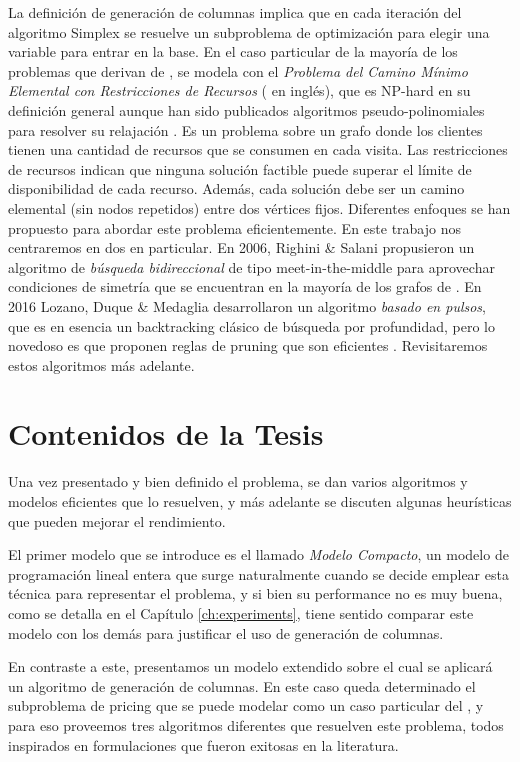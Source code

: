 La definición de generación de columnas implica que en cada iteración del algoritmo Simplex se resuelve un subproblema de optimización para elegir una variable para entrar en la base. En el caso particular de la mayoría de los problemas que derivan de , se modela con el \emph{Problema del Camino Mínimo Elemental con Restricciones de Recursos} ( en inglés), que es NP-hard en su definición general aunque han sido publicados algoritmos pseudo-polinomiales para resolver su relajación \cite{christo-et-al}. Es un problema sobre un grafo donde los clientes tienen una cantidad de recursos que se consumen en cada visita. Las restricciones de recursos indican que ninguna solución factible puede superar el límite de disponibilidad de cada recurso. Además, cada solución debe ser un camino elemental (sin nodos repetidos) entre dos vértices fijos. Diferentes enfoques se han propuesto para abordar este problema eficientemente. En este trabajo nos centraremos en dos en particular. En 2006, Righini \& Salani propusieron un algoritmo de \emph{búsqueda bidireccional} de tipo meet-in-the-middle para aprovechar condiciones de simetría que se encuentran en la mayoría de los grafos de  \cite{righini-salani}. En 2016 Lozano, Duque \& Medaglia desarrollaron un algoritmo \emph{basado en pulsos}, que es en esencia un backtracking clásico de búsqueda por profundidad, pero lo novedoso es que proponen reglas de pruning que son eficientes \cite{lozano-duque-medaglia}. Revisitaremos estos algoritmos más adelante.

\section{Contenidos de la Tesis}

Una vez presentado y bien definido el problema, se dan varios algoritmos y modelos eficientes que lo resuelven, y más adelante se discuten algunas heurísticas que pueden mejorar el rendimiento. 

El primer modelo que se introduce es el llamado \emph{Modelo Compacto}, un modelo de programación lineal entera que surge naturalmente cuando se decide emplear esta técnica para representar el problema, y si bien su performance no es muy buena, como se detalla en el Capítulo \ref{ch:experiments}, tiene sentido comparar este modelo con los demás para justificar el uso de generación de columnas.

En contraste a este, presentamos un modelo extendido sobre el cual se aplicará un algoritmo de generación de columnas. En este caso queda determinado el subproblema de pricing que se puede modelar como un caso particular del , y para eso proveemos tres algoritmos diferentes que resuelven este problema, todos inspirados en formulaciones que fueron exitosas en la literatura. 

